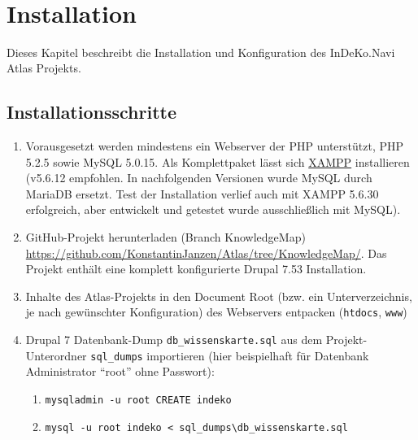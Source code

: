 \tableofcontents 

\newpage
\listoffigures
\thispagestyle{empty} 


\newpage
\restoregeometry
{}




\section{Installation}
Dieses Kapitel beschreibt die Installation und Konfiguration des InDeKo.Navi Atlas Projekts.


\subsection{Installationsschritte}
\begin{enumerate}
	\item Vorausgesetzt werden mindestens ein Webserver der PHP unterstützt, PHP 5.2.5 sowie MySQL 5.0.15. Als Komplettpaket lässt sich \zB \href{https://www.apachefriends.org/de/download.html}{XAMPP} installieren (v5.6.12 empfohlen. In nachfolgenden Versionen wurde MySQL durch MariaDB ersetzt. Test der Installation verlief auch mit XAMPP 5.6.30 erfolgreich, aber entwickelt und getestet wurde ausschließlich mit MySQL).
	
	\item GitHub-Projekt herunterladen (Branch KnowledgeMap) \url{https://github.com/KonstantinJanzen/Atlas/tree/KnowledgeMap/}.
	Das Projekt enthält eine komplett konfigurierte Drupal 7.53 Installation.
	
	\item Inhalte des Atlas-Projekts in den Document Root (bzw. ein Unterverzeichnis, je nach gewünschter Konfiguration) des Webservers entpacken (\zB \lstinline|htdocs|, \lstinline|www|)
	
	\item Drupal 7 Datenbank-Dump \lstinline|db_wissenskarte.sql| aus dem Projekt-Unterordner \lstinline|sql_dumps| importieren (hier beispielhaft für Datenbank Administrator \enquote{root} ohne Passwort):
	\begin{enumerate}
		\item \lstinline|mysqladmin -u root CREATE indeko|
		
		\item \lstinline|mysql -u root indeko < sql_dumps\db_wissenskarte.sql|
	\end{enumerate}
	

\end{enumerate}
